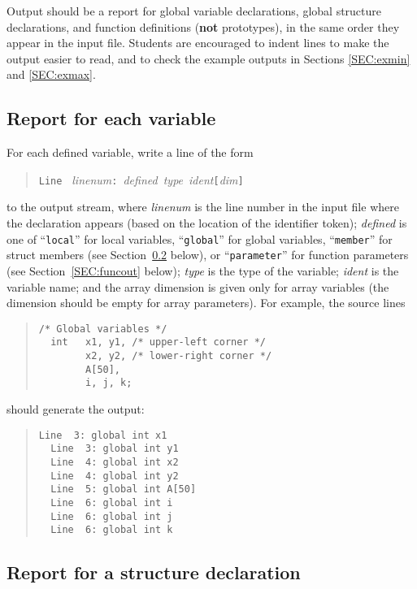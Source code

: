 \documentclass{article}
\begin{document}
Output should be a report for global variable declarations,
global structure declarations, and function definitions
({\bf not} prototypes),
in the same order they appear in the input file.
Students are encouraged to indent lines to make the output easier to read,
and to check the example outputs
in Sections \ref{SEC:exmin} and \ref{SEC:exmax}.

\subsection{Report for each variable}

For each defined variable,
write a line of the form
\begin{quote}
  {\tt Line } \emph{linenum}{\tt :}~\emph{defined}~\emph{type}~\emph{ident}\verb|[|\emph{dim}\verb|]|
\end{quote}
to the output stream,
where \emph{linenum} is the line number in the input file where the
declaration appears (based on the location of the identifier token);
\emph{defined} is one of ``\verb|local|'' for local variables,
  ``\verb|global|'' for global variables,
  ``\verb|member|'' for struct members (see Section~\ref{SEC:structout} below),
  or
  ``\verb|parameter|'' for function parameters (see Section~\ref{SEC:funcout} below);
\emph{type} is the type of the variable;
\emph{ident} is the variable name;
and the array dimension is given only for array variables
(the dimension should be empty for array parameters).
For example,
the source lines
\begin{quote}
  \begin{lstlisting}[firstnumber=2]
  /* Global variables */
  int   x1, y1, /* upper-left corner */
        x2, y2, /* lower-right corner */
        A[50],
        i, j, k;
  \end{lstlisting}
\end{quote}
should generate the output:
\begin{quote}
  \begin{lstlisting}[style=Output]
  Line  3: global int x1
  Line  3: global int y1
  Line  4: global int x2
  Line  4: global int y2
  Line  5: global int A[50]
  Line  6: global int i
  Line  6: global int j
  Line  6: global int k
  \end{lstlisting}
\end{quote}


\subsection{Report for a structure declaration}
\label{SEC:structout}
\end{document}
